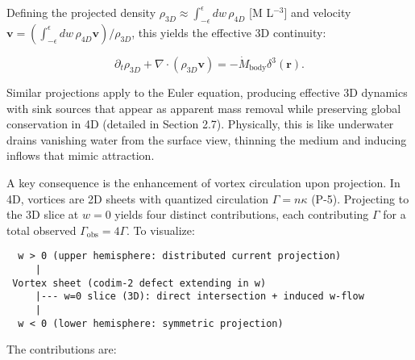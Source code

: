 Defining the projected density $\rho_{3D} \approx \int_{-\epsilon}^{\epsilon} dw \, \rho_{4D}$ [M L$^{-3}$] and velocity $\mathbf{v} = \left( \int_{-\epsilon}^{\epsilon} dw \, \rho_{4D} \mathbf{v} \right) / \rho_{3D}$, this yields the effective 3D continuity:

\[
\partial_t \rho_{3D} + \nabla \cdot (\rho_{3D} \mathbf{v}) = -\dot{M}_{\text{body}} \delta^3(\mathbf{r}).
\]

Similar projections apply to the Euler equation, producing effective 3D dynamics with sink sources that appear as apparent mass removal while preserving global conservation in 4D (detailed in Section 2.7). Physically, this is like underwater drains vanishing water from the surface view, thinning the medium and inducing inflows that mimic attraction.

A key consequence is the enhancement of vortex circulation upon projection. In 4D, vortices are 2D sheets with quantized circulation $\Gamma = n \kappa$ (P-5). Projecting to the 3D slice at $w=0$ yields four distinct contributions, each contributing $\Gamma$ for a total observed $\Gamma_{\text{obs}} = 4\Gamma$. To visualize:

\begin{verbatim}
  w > 0 (upper hemisphere: distributed current projection)
     |
 Vortex sheet (codim-2 defect extending in w)
     |--- w=0 slice (3D): direct intersection + induced w-flow
     |
  w < 0 (lower hemisphere: symmetric projection)
\end{verbatim}

The contributions are:

